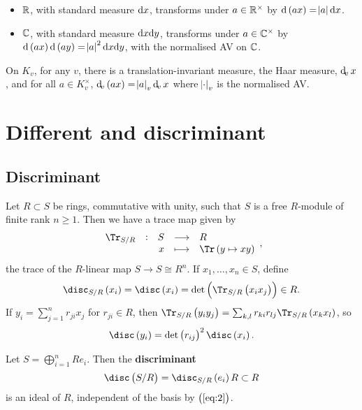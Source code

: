 \begin{remark*}
\hfill
\begin{itemize}
\item $ \mathbb{R} $, with standard measure $ \mathrm{d} x $, transforms under $ a \in \mathbb{R}^\times $ by $ \d\br{ax} = \abs{a}\d x $.
\item $ \mathbb{C} $, with standard measure $ \mathrm{d} x\mathrm{d} y $, transforms under $ a \in \mathbb{C}^\times $ by $ \d\br{ax}\d\br{ay} = \abs{a}^2\d x\d y $, with the normalised AV on $ \mathbb{C} $.
\end{itemize}
\end{remark*}

\begin{fact*}
On $ K_v $, for any $ v $, there is a translation-invariant measure, the Haar measure, $ \dv x $, and for all $ a \in K_v^\times $, $ \dv\br{ax} = \abs{a}_v\dv x $ where $ \abs{\cdot}_v $ is the normalised AV.
\end{fact*}

\pagebreak

\section{Different and discriminant}

\subsection{Discriminant}

Let $ R \subset S $ be rings, commutative with unity, such that $ S $ is a free $ R $-module of finite rank $ n \ge 1 $. Then we have a trace map given by
$$ \function[\Tr_{S / R}]{S}{R}{x}{\Tr\br{y \mapsto xy}}, $$
the trace of the $ R $-linear map $ S \to S \cong R^n $. If $ x_1, \dots, x_n \in S $, define
$$ \disc_{S / R} \br{x_i} = \disc \br{x_i} = \det \br{\Tr_{S / R}\br{x_ix_j}} \in R. $$
If $ y_i = \sum_{j = 1}^n r_{ji}x_j $ for $ r_{ji} \in R $, then $ \Tr_{S / R}\br{y_iy_j} = \sum_{k, l} r_{ki}r_{lj}\Tr_{S / R}\br{x_kx_l} $, so
\begin{equation}
\label{eq:2}
\disc \br{y_i} = \det \br{r_{ij}}^2 \disc \br{x_i}.
\end{equation}

\begin{definition*}
Let $ S = \bigoplus_{i = 1}^n Re_i $. Then the \textbf{discriminant}
$$ \disc\br{S / R} = \disc_{S / R} \br{e_i}R \subset R $$
is an ideal of $ R $, independent of the basis by $ \br{\ref{eq:2}} $.
\end{definition*}

